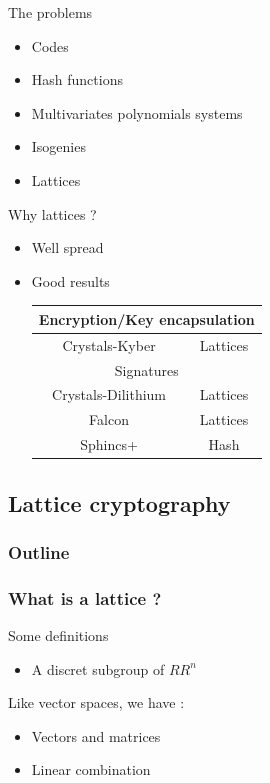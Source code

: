 \documentclass{beamer}
\begin{document}
\begin{frame}{The problems}
	\begin{itemize}
		\item Codes
		\item Hash functions
		\item Multivariates polynomials systems
		\item Isogenies
		\item { Lattices}
	\end{itemize}
\end{frame}

\begin{frame}{Why lattices ?}
	\begin{itemize}
		\item Well spread
		\item Good results
			\begin{table}[h!]
			\begin{tabular}{|c|c|}
				\hline
				\multicolumn{2}{|c|}{Encryption/Key encapsulation} \\
				\hline
				Crystals-Kyber & Lattices \\
				\hline
				\multicolumn{2}{|c|}{Signatures} \\
				\hline
				Crystals-Dilithium & Lattices \\
				Falcon & Lattices \\
				Sphincs+ & Hash \\
				\hline
			\end{tabular}
			\end{table}
	\end{itemize}
\end{frame}

\subsection{Lattice cryptography}
\begin{frame}
  \frametitle{Outline}
\end{frame}

\subsubsection{What is a lattice ?}
\begin{frame}{Some definitions}
	\begin{itemize}
		\item A discret subgroup of $RR^n$
	\end{itemize}

	Like vector spaces, we have :
	\begin{itemize}
		\item Vectors and matrices
		\item Linear combination
	\end{itemize}
\end{frame}
\end{document}
